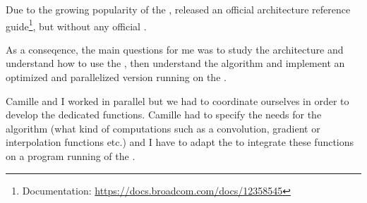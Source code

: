Due to the growing popularity of the \rasp{},  released an official \vc{} architecture reference guide\footnote{\vc{} Documentation: \url{https://docs.broadcom.com/docs/12358545}}, but without any official .

As a conseqence, the main questions for me was to study the architecture and understand how to use the \vc{}, then understand the \flow{} algorithm and implement an optimized and parallelized version running on the \vc{}.

Camille and I worked in parallel but we had to coordinate ourselves in order to develop the dedicated functions. Camille had to specify the needs for the \flow{} algorithm (what kind of computations such as a convolution, gradient or interpolation functions etc.) and I have to adapt the  to integrate these functions on a program running of the \vc.

